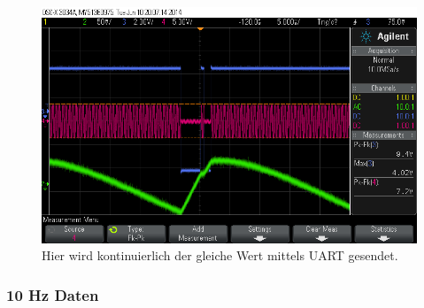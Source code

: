\documentclass[12pt,a4paper]{article}
\begin{document}
\begin{figure}[H]
  \centering
    \includegraphics[width=\textwidth]{../measurements/20140610/uart_continous_key/scope_0.png}
  \caption{Hier wird kontinuierlich der gleiche Wert mittels UART gesendet.}
  \label{fig:uart_continous_key}
\end{figure}

\subsubsection{10 Hz Daten}
\end{document}
